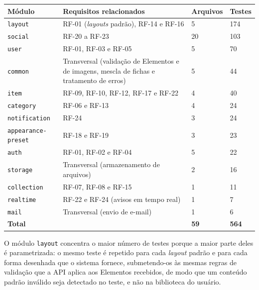 \begin{quadro}[h!]
\caption{Distribuição dos testes de unidade por módulo}
\label{quad:resumoTestes}
\begin{tabular}{|p{3.9cm}|p{5.6cm}|p{1.9cm}|p{1.6cm}|}
\hline
\textbf{Módulo} & \textbf{Requisitos relacionados} & \textbf{Arquivos} & \textbf{Testes} \\ \hline
\texttt{layout} & RF-01 (\textit{layouts} padrão), RF-14 e RF-16 & 5 & 174 \\ \hline
\texttt{social} & RF-20 a RF-23 & 20 & 103 \\ \hline
\texttt{user} & RF-01, RF-03 e RF-05 & 5 & 70 \\ \hline
\texttt{common} & Transversal (validação de Elementos e de imagens, mescla de fichas e tratamento de erros) & 5 & 44 \\ \hline
\texttt{item} & RF-09, RF-10, RF-12, RF-17 e RF-22 & 4 & 40 \\ \hline
\texttt{category} & RF-06 e RF-13 & 4 & 24 \\ \hline
\texttt{notification} & RF-24 & 3 & 24 \\ \hline
\texttt{appearance-preset} & RF-18 e RF-19 & 3 & 23 \\ \hline
\texttt{auth} & RF-01, RF-02 e RF-04 & 5 & 22 \\ \hline
\texttt{storage} & Transversal (armazenamento de arquivos) & 2 & 16 \\ \hline
\texttt{collection} & RF-07, RF-08 e RF-15 & 1 & 11 \\ \hline
\texttt{realtime} & RF-22 e RF-24 (avisos em tempo real) & 1 & 7 \\ \hline
\texttt{mail} & Transversal (envio de e-mail) & 1 & 6 \\ \hline
\textbf{Total} &  & \textbf{59} & \textbf{564} \\ \hline
\end{tabular}
\end{quadro}

O módulo \texttt{layout} concentra o maior número de testes porque a maior parte deles é parametrizada: o mesmo teste é repetido para cada \textit{layout} padrão e para cada forma desenhada que o sistema fornece, submetendo-os às mesmas regras de validação que a API aplica aos Elementos recebidos, de modo que um conteúdo padrão inválido seja detectado no teste, e não na biblioteca do usuário.

